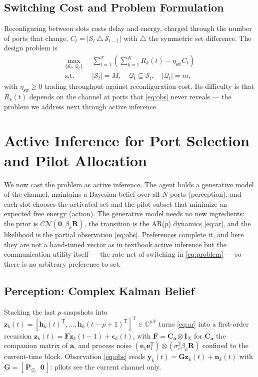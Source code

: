 \documentclass[journal]{IEEEtran}
\newcommand{\bh}{\mathbf{h}}
\newcommand{\bR}{\mathbf{R}}
\newcommand{\bI}{\mathbf{I}}
\newcommand{\bP}{\mathbf{P}}
\newcommand{\bF}{\mathbf{F}}
\newcommand{\by}{\mathbf{y}}
\newcommand{\bn}{\mathbf{n}}
\newcommand{\bz}{\mathbf{z}}
\newcommand{\CN}{\mathcal{CN}}
\newcommand{\bbC}{\mathbb{C}}
\begin{document}
\subsection{Switching Cost and Problem Formulation}
Reconfiguring between slots costs delay and energy, charged through the number
of ports that change, $C_t=|\mathcal{S}_t\,\triangle\,\mathcal{S}_{t-1}|$ with
$\triangle$ the symmetric set difference. The design problem is
\begin{equation}
  \begin{aligned}
    \max_{\{\mathcal{S}_t,\,\mathcal{Q}_t\}}\;\;
      & \sum_{t=1}^{T}\left(\sum_{k=1}^{K}R_k(t)-\eta_{\mathrm{sw}}C_t\right)\\[-2pt]
    \text{s.t.}\;\;
      & |\mathcal{S}_t|=M,\quad
        \mathcal{Q}_t\subseteq\mathcal{S}_t,\quad
        |\mathcal{Q}_t|=m,
  \end{aligned}
  \label{eq:problem}
\end{equation}
with $\eta_{\mathrm{sw}}\ge0$ trading throughput against reconfiguration cost.
Its difficulty is that $R_k(t)$ depends on the channel at ports that
\eqref{eq:obs} never reveals --- the problem we address next through active
inference.

\section{Active Inference for Port Selection and Pilot Allocation}
\label{sec:aif}

We now cast the problem as active inference. The agent holds a generative model
of the channel, maintains a Bayesian belief over all $N$ ports (perception),
and each slot chooses the activated set and the pilot subset that minimize an
expected free energy (action). The generative model needs no new ingredients:
the prior is $\CN(\mathbf{0},\beta_k\bR)$, the transition is the AR($p$)
dynamics \eqref{eq:ar}, and the likelihood is the partial observation
\eqref{eq:obs}. Preferences complete it, and here they are not a hand-tuned
vector as in textbook active inference but the communication utility itself ---
the rate net of switching in \eqref{eq:problem} --- so there is no arbitrary
preference to set.

\subsection{Perception: Complex Kalman Belief}
Stacking the last $p$ snapshots into
$\bz_k(t)=[\bh_k(t)^{\mathrm{T}},\dots,\bh_k(t-p+1)^{\mathrm{T}}]^{\mathrm{T}}
\in\bbC^{pN}$ turns \eqref{eq:ar} into a first-order recursion
$\bz_k(t)=\bF\bz_k(t-1)+\boldsymbol{\epsilon}_k(t)$, with
$\bF=\mathbf{C}_{\mathbf{a}}\otimes\bI_N$ for $\mathbf{C}_{\mathbf{a}}$ the
companion matrix of $\mathbf{a}$, and process noise
$(\mathbf{e}_1\mathbf{e}_1^{\mathrm{T}})\otimes(\sigma_v^2\beta_k\bR)$ confined
to the current-time block. Observation \eqref{eq:obs} reads
$\by_k(t)=\mathbf{G}\bz_k(t)+\bn_k(t)$ with
$\mathbf{G}=[\,\bP_{\mathcal{Q}_t}\;\;\mathbf{0}\,]$: pilots see the current
channel only.
\end{document}
